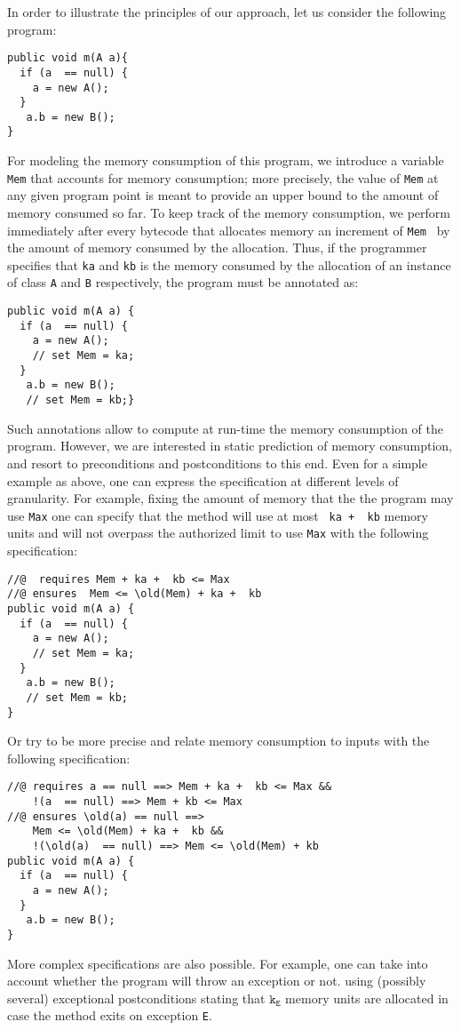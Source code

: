 In order to illustrate the principles of our approach, let us consider
the following program:

\begin{lstlisting}[frame=trbl] 
public void m(A a){
  if (a  == null) {
    a = new A();
  }  
   a.b = new B();
}
\end{lstlisting}

For modeling the memory consumption of this program, we introduce
a \ghost{}  variable \lstinline!Mem! that accounts for memory consumption; more
precisely, the value of \lstinline!Mem! at any given program point is meant
to provide an upper bound to the amount of memory consumed so far. To
keep track of the memory consumption, we perform immediately after every 
bytecode that allocates memory an increment of \lstinline!Mem! \ by the amount
of memory consumed by the allocation. Thus, if the programmer specifies
that \lstinline!ka! and \lstinline!kb! is the memory consumed by the allocation of 
an instance of class \lstinline!A! and  \lstinline!B! respectively, the program must
be annotated as:
\begin{lstlisting}[frame=trbl] 
public void m(A a) {
  if (a  == null) {
    a = new A();
    // set Mem = ka;
  }  
   a.b = new B();
   // set Mem = kb;}
\end{lstlisting}

Such annotations allow to compute at run-time the memory consumption of 
the program. However, we are interested in static prediction of memory
consumption, and resort to preconditions and postconditions to this end.
Even for a simple example as above, one can express the specification
at different levels of granularity. For example, fixing the amount of memory that
the the program may use \lstinline!Max! one can specify that the method will use at most 
\lstinline! ka +  kb! memory units and will not overpass the authorized limit to use \lstinline!Max! with the following specification:

\begin{lstlisting}[frame=trbl] 
//@  requires Mem + ka +  kb <= Max 
//@ ensures  Mem <= \old(Mem) + ka +  kb     
public void m(A a) {
  if (a  == null) {
    a = new A();
    // set Mem = ka;
  }  
   a.b = new B();
   // set Mem = kb;
}
\end{lstlisting}
Or try to be more precise and relate memory consumption to inputs with
the following specification:
\begin{lstlisting}[frame=trbl] 
//@ requires a == null ==> Mem + ka +  kb <= Max &&	 
    !(a  == null) ==> Mem + kb <= Max
//@ ensures \old(a) == null ==> 
    Mem <= \old(Mem) + ka +  kb && 
    !(\old(a)  == null) ==> Mem <= \old(Mem) + kb    
public void m(A a) {
  if (a  == null) {
    a = new A();
  }  
   a.b = new B();
}
\end{lstlisting}
More complex specifications are also possible. For example, one can
take into account whether the program will throw an exception or not.
using (possibly several) exceptional postconditions stating that
$\texttt{k}_{\texttt{E}}$ memory units are allocated in case the
method exits on exception \texttt{E}.



